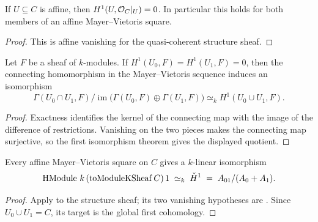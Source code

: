 \begin{proposition}
  \label{thm:adelic_affine_h1_vanishing}
  \leanok
  If \(U\subseteq C\) is affine, then
  \(H^1(U,\mathcal{O}_{C}|_U)=0\).  In particular this holds for both members
  of an affine Mayer--Vietoris square.
\end{proposition}
\begin{proof}
  \leanok
  This is affine vanishing for the quasi-coherent structure sheaf.
\end{proof}

\begin{proposition}
  \label{thm:adelic_mv_h1_cokernel_equiv}
  \leanok
  Let \(F\) be a sheaf of \(k\)-modules.  If
  \(H^1(U_0,F)=H^1(U_1,F)=0\), then the connecting homomorphism in the
  Mayer--Vietoris sequence induces an isomorphism
  \[
    \Gamma(U_0\cap U_1,F)/
      \operatorname{im}\bigl(\Gamma(U_0,F)\oplus\Gamma(U_1,F)\bigr)
      \simeq_k H^1(U_0\cup U_1,F).
  \]
\end{proposition}
\begin{proof}
  \leanok
  Exactness identifies the kernel of the connecting map with the image of
  the difference of restrictions.  Vanishing on the two pieces makes the
  connecting map surjective, so the first isomorphism theorem gives the
  displayed quotient.
\end{proof}

\begin{theorem}
  \label{thm:adelic_HModuleOne_linearEquiv_cokernel}
  \leanok
  Every affine Mayer--Vietoris square on \(C\) gives a \(k\)-linear
  isomorphism
  \[
    \operatorname{HModule}\, k\, (\operatorname{toModuleKSheaf} C)\, 1
    \;\simeq_k\; \check{H}^1 \;=\; A_{01}/(A_0 + A_1).
  \]
\end{theorem}
\begin{proof}
  \leanok
  Apply  to the structure sheaf;
  its two vanishing hypotheses are .
  Since \(U_0\cup U_1=C\), its target is the global first cohomology.
\end{proof}

